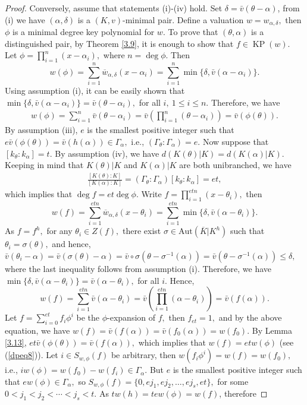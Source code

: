 \documentclass[11pt]{amsart}
\theoremstyle{definition}
\theoremstyle{remark}
\numberwithin{equation}{section}
\begin{document}
\begin{proof}
	Conversely, assume that statements (i)-(iv) hold.
	Set $\delta=\bar{v}(\theta-\alpha)$, from (i) we have $(\alpha,\delta)$ is a $(K,v)$-minimal pair. Define a valuation $w=w_{\alpha,\delta},$ then $\phi$ is a minimal degree key polynomial for $w.$ To prove that $(\theta,\alpha)$ is a distinguished pair, by Theorem \ref{3.9}, it is enough to show that $f \in \operatorname{KP}(w).$ \\
	Let $\phi=\prod_{i=1}^n(x-\alpha_i),$ where $n=\deg\phi$. Then
	\[w(\phi)=\sum_{i=1}^n\overline{w}_{\alpha,\delta}(x-\alpha_i)=\sum_{i=1}^n\min\{\delta,\bar{v}(\alpha-\alpha_i)\}.\] Using assumption (i), it can be easily shown that $\min\{\delta,\bar{v}(\alpha-\alpha_i)\}=\bar{v}(\theta-\alpha_i),$ for all $i, \ 1\leq i\leq n.$ Therefore, we have
	\begin{align}\label{dpeq8}
	w(\phi)=\sum_{i=1}^n\bar{v}(\theta-\alpha_i)=\bar{v}(\prod_{i=1}^n(\theta-\alpha_i))=\bar{v}(\phi(\theta)).
	\end{align} By assumption (iii), $e$ is the smallest positive integer such that $e\bar{v}(\phi(\theta))=\bar{v}(h(\alpha))\in \Gamma_\alpha,$ i.e., $(\Gamma_\theta:\Gamma_\alpha)=e.$ Now suppose that $[k_\theta:k_\alpha]=t.$ By assumption (iv), we have $d(K(\theta)|K)=d(K(\alpha)|K).$ Keeping in mind that $K(\theta)|K$ and $K(\alpha)|K$ are both unibranched, we have
	\begin{align*}
	\frac{[K(\theta):K]}{[K(\alpha):K]}=(\Gamma_\theta:\Gamma_\alpha)[k_\theta:k_\alpha]=et,
		\end{align*}
		which implies that $\deg f=et\deg \phi.$ Write $f=\prod_{i=1}^{etn}(x-\theta_i),$  then
	\[w(f)=\sum_{i=1}^{etn}\overline{w}_{\alpha,\delta}(x-\theta_i)=\sum_{i=1}^{etn}\min\{\delta,\bar{v}(\alpha-\theta_i)\}.\] As $f=f^h,$ for any $\theta_i\in Z(f),$ there exist $\sigma\in \text{Aut}(\overline{K}|K^h)$ such that $\theta_i=\sigma(\theta),$ and hence, $\bar{v}(\theta_i-\alpha)=\bar{v}(\sigma(\theta)-\alpha)=\bar{v}\circ\sigma(\theta-\sigma^{-1}(\alpha))=\bar{v}(\theta-\sigma^{-1}(\alpha))\leq\delta,$ where the last inequality follows from assumption (i). Therefore, we have $\min\{\delta,\bar{v}(\alpha-\theta_i)\}=\bar{v}(\alpha-\theta_i),$ for all $i.$ Hence,
		\[w(f)=\sum_{i=1}^{etn}\bar{v}(\alpha-\theta_i)=\bar{v}(\prod_{i=1}^{etn}(\alpha-\theta_i))=\bar{v}(f(\alpha)).\]Let $f=\sum_{i= 0}^{et}f_i\phi^i$ be the $\phi$-expansion of $f,$ then $f_{et}=1,$ and by the above equation, we have $w(f)=\bar{v}(f(\alpha))=\bar{v}(f_0(\alpha))=w(f_0).$ By Lemma \ref{3.13}, $et\bar{v}(\phi(\theta))=\bar{v}(f(\alpha)),$ which implies  that $w(f)=etw(\phi)$ (see (\ref{dpeq8})). Let $i\in S_{w,\phi}(f)$ be arbitrary, then $w(f_i\phi^i)=w(f)=w(f_0),$ i.e., $iw(\phi)=w(f_0)-w(f_i)\in \Gamma_\alpha.$ But $e$ is the smallest positive integer such that $ew(\phi)\in \Gamma_\alpha,$ so $S_{w,\phi}(f)=\{0, ej_1, ej_2, \ldots, ej_s, et\},$ for some $0<j_1<j_2<\cdots<j_s<t.$ As $tw(h)=tew(\phi)=w(f)$, therefore

\end{proof}
\end{document}
